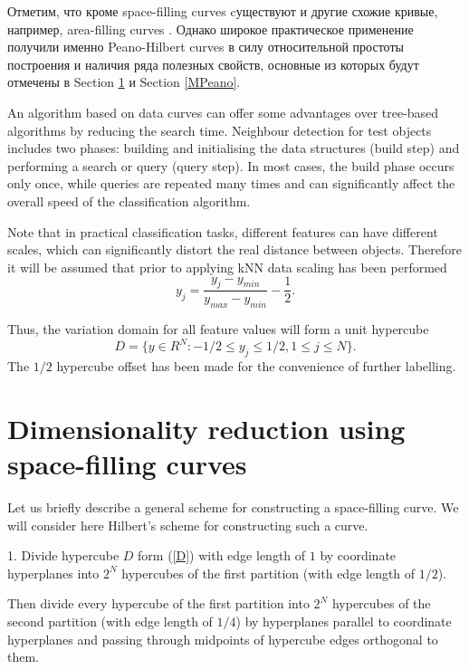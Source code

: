 \documentclass[entropy,article,submit,moreauthors,pdftex]{Definitions/mdpi}
\begin{document}
Отметим, что кроме space-filling curves cуществуют и другие схожие кривые, например, area-filling curves \cite{Nasso2022}. Однако широкое практическое применение получили именно Peano-Hilbert curves в силу относительной простоты построения и наличия ряда полезных свойств, основные из которых будут отмечены в Section \ref{Peano} и Section \ref{MPeano}.


An algorithm based on data curves can offer some advantages over tree-based algorithms by reducing the search time. Neighbour detection for test objects includes two phases: building and initialising the data structures (build step) and performing a search or query (query step). In most cases, the build phase occurs only once, while queries are repeated many times and can significantly affect the overall speed of the classification algorithm. 

Note that in practical classification tasks, different features can have different scales, which can significantly distort the real distance between objects. Therefore it will be assumed that prior to applying kNN data scaling has been performed 
\begin{equation}
y_j = \frac{y_j - y_{min}} {y_{max} - y_{min}} - \frac{1} {2}.
\end{equation} 

Thus, the variation domain for all feature values will form a unit hypercube
\begin{equation}\label{D}
D = \{ y \in R^N: -1/2 \leq y_j \leq 1/2,  1 \leq j \leq N \}.
\end{equation} 
The $1/2$ hypercube offset  has been made for the convenience of further labelling.

\section{Dimensionality reduction using space-filling curves}\label{Peano}

Let us briefly describe a general scheme for constructing a space-filling curve. We will consider here Hilbert's scheme for constructing such a curve.

1. Divide hypercube $D$ form (\ref{D}) with edge length of $1$ by coordinate hyperplanes into $2^N$ hypercubes of the first partition (with edge length of $1/2$).

Then divide every hypercube of the first partition into $2^N$  hypercubes of the second partition (with edge length of $1/4$) by hyperplanes parallel to coordinate hyperplanes and passing through midpoints of hypercube edges orthogonal to them.
\end{document}
